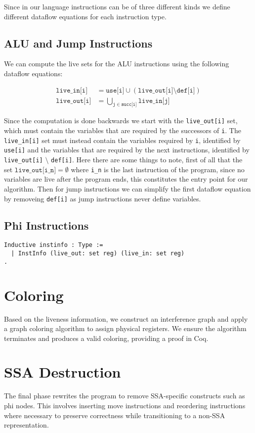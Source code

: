 Since in our language instructions can be of three different kinds we define different dataflow equations for each instruction type.

\subsection{ALU and Jump Instructions}

We can compute the live sets for the ALU instructions using the following dataflow equations:

\begin{align*}
  \texttt{live\_in[i]} &= \texttt{use[i]} \cup (\texttt{live\_out[i]} \setminus \texttt{def[i]}) \\
  \texttt{live\_out[i]} &= \bigcup \limits_{\texttt j \in \texttt{succ[i]}} \texttt{live\_in[j]}
\end{align*}

Since the computation is done backwards we start with the \texttt{live\_out[i]} set, which must contain the variables that are required by the successors of \texttt i. The
\texttt{live\_in[i]} set must instead contain the variables required by \texttt i, identified by \texttt{use[i]} and the variables that are required by the next instructions, identified by \texttt{live\_out[i]} $\setminus$ \texttt{def[i]}.
Here there are some things to note, first of all that the set $\texttt{live\_out[i\_n]} = \emptyset$ where \texttt{i\_n} is the last instruction of the program, since no variables are live after the program ends, this constitutes the entry point for our algorithm.
Then for jump instructions we can simplify the first dataflow equation by removeing \texttt{def[i]} as jump instructions never define variables.

\subsection{Phi Instructions}



\begin{lstlisting}[language=Coq]
Inductive instinfo : Type :=
  | InstInfo (live_out: set reg) (live_in: set reg)
.
\end{lstlisting}

\section{Coloring}

Based on the liveness information, we construct an interference graph and apply a graph coloring algorithm to assign physical registers. We ensure the algorithm terminates and produces a valid coloring, providing a proof in Coq.

\section{SSA Destruction}

The final phase rewrites the program to remove SSA-specific constructs such as phi nodes. This involves inserting move instructions and reordering instructions where necessary to preserve correctness while transitioning to a non-SSA representation.